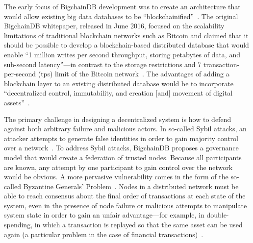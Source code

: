 The early focus of BigchainDB development was to create an
architecture that would allow existing big data databases to be
``blockchainified''~\cite{bigDB16a}. The original BigchainDB whitepaper,
released in June 2016, focused on the scalability limitations of traditional
blockchain networks such as Bitcoin and claimed that it should be possible
to develop a blockchain-based distributed database that would enable ``1
million writes per second throughput, storing petabytes of data, and
sub-second latency''---in contrast to the storage restrictions and 7
transaction-per-second (tps) limit of the Bitcoin network~\cite{bigDB16a}.
The advantages of adding a blockchain layer to an existing distributed
database would be to incorporate ``decentralized control, immutability, and
creation [and] movement of digital assets''~\cite{bigDB16a}. 

The primary challenge in designing a decentralized system is how to
defend against both arbitrary failure and malicious actors. In so-called
Sybil attacks, an attacker attempts to generate false identities in order to
gain majority control over a network~\cite{dJ02}. To address Sybil attacks,
BigchainDB proposes a governance model that would create a federation of
trusted nodes. Because all participants are known, any attempt by one
participant to gain control over the network would be obvious. A more
pervasive vulnerability comes in the form of the so-called Byzantine
Generals' Problem~\cite{bigDB16a}. Nodes in a distributed network must be
able to reach consensus about the final order of transactions at each state
of the system, even in the presence of node failure or malicious attempts to
manipulate system state in order to gain an unfair advantage---for example,
in double-spending, in which a transaction is replayed so that the same
asset can be used again (a particular problem in the case of financial
transactions)~\cite{bigDB16a, aA17}.

